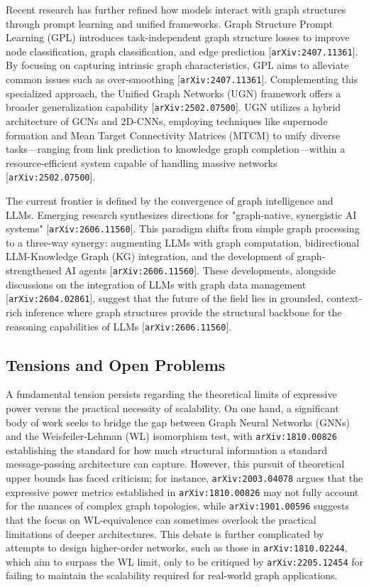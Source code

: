 \documentclass[11pt]{article}
\begin{document}
Recent research has further refined how models interact with graph structures through prompt learning and unified frameworks. Graph Structure Prompt Learning (GPL) introduces task-independent graph structure losses to improve node classification, graph classification, and edge prediction [\texttt{arXiv:2407.11361}]. By focusing on capturing intrinsic graph characteristics, GPL aims to alleviate common issues such as over-smoothing [\texttt{arXiv:2407.11361}]. Complementing this specialized approach, the Unified Graph Networks (UGN) framework offers a broader generalization capability [\texttt{arXiv:2502.07500}]. UGN utilizes a hybrid architecture of GCNs and 2D-CNNs, employing techniques like supernode formation and Mean Target Connectivity Matrices (MTCM) to unify diverse tasks—ranging from link prediction to knowledge graph completion—within a resource-efficient system capable of handling massive networks [\texttt{arXiv:2502.07500}].

The current frontier is defined by the convergence of graph intelligence and LLMs. Emerging research synthesizes directions for "graph-native, synergistic AI systems" [\texttt{arXiv:2606.11560}]. This paradigm shifts from simple graph processing to a three-way synergy: augmenting LLMs with graph computation, bidirectional LLM-Knowledge Graph (KG) integration, and the development of graph-strengthened AI agents [\texttt{arXiv:2606.11560}]. These developments, alongside discussions on the integration of LLMs with graph data management [\texttt{arXiv:2604.02861}], suggest that the future of the field lies in grounded, context-rich inference where graph structures provide the structural backbone for the reasoning capabilities of LLMs [\texttt{arXiv:2606.11560}].

\subsection{Tensions and Open Problems}

A fundamental tension persists regarding the theoretical limits of expressive power versus the practical necessity of scalability. On one hand, a significant body of work seeks to bridge the gap between Graph Neural Networks (GNNs) and the Weisfeiler-Lehman (WL) isomorphism test, with \texttt{arXiv:1810.00826} establishing the standard for how much structural information a standard message-passing architecture can capture. However, this pursuit of theoretical upper bounds has faced criticism; for instance, \texttt{arXiv:2003.04078} argues that the expressive power metrics established in \texttt{arXiv:1810.00826} may not fully account for the nuances of complex graph topologies, while \texttt{arXiv:1901.00596} suggests that the focus on WL-equivalence can sometimes overlook the practical limitations of deeper architectures. This debate is further complicated by attempts to design higher-order networks, such as those in \texttt{arXiv:1810.02244}, which aim to surpass the WL limit, only to be critiqued by \texttt{arXiv:2205.12454} for failing to maintain the scalability required for real-world graph applications.
\end{document}
